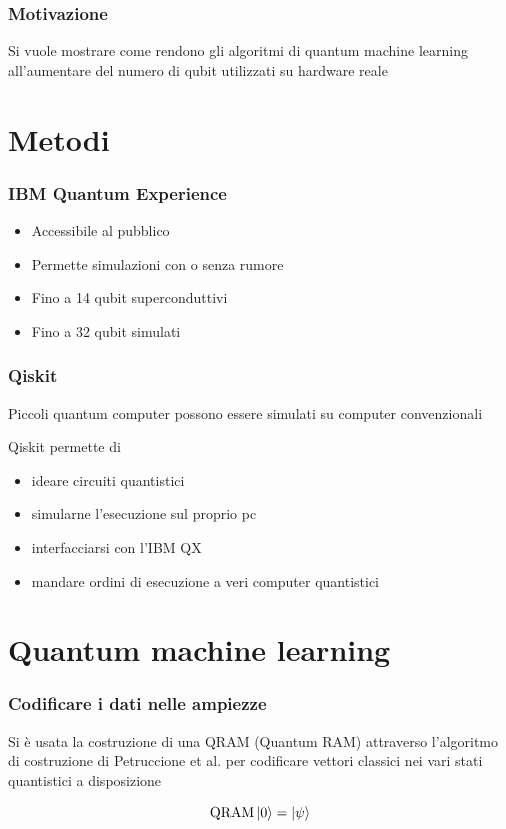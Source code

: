 \documentclass{beamer}
\begin{document}
	\begin{frame}
		\frametitle{Motivazione}
	
		Si vuole mostrare come rendono gli algoritmi di quantum machine 
		learning all'aumentare del numero di qubit utilizzati su hardware reale
	
	\end{frame}

	\section{Metodi}

	\begin{frame}
		\frametitle{IBM Quantum Experience}
	
		\begin{itemize}
			\item Accessibile al pubblico
			\item Permette simulazioni con o senza rumore
			\item Fino a 14 qubit superconduttivi
			\item Fino a 32 qubit simulati
		\end{itemize}
		
	
	\end{frame}

	\begin{frame}
		\frametitle{Qiskit}
	
		Piccoli quantum computer possono essere simulati su computer convenzionali

		Qiskit permette di 

		\begin{itemize}
			\item ideare circuiti quantistici
			\item simularne l'esecuzione sul proprio pc
			\item interfacciarsi con l'IBM QX
			\item mandare ordini di esecuzione a veri computer quantistici
		\end{itemize}
	
	\end{frame}

	\section{Quantum machine learning}

	\begin{frame}
		\frametitle{Codificare i dati nelle ampiezze}
	
		Si è usata la costruzione di una QRAM (Quantum RAM) attraverso 
		l'algoritmo di costruzione di Petruccione et al. per 
		codificare vettori classici nei vari stati quantistici 
		a disposizione

		\begin{equation*}
			\text{QRAM} \ket{0} = \ket{\psi}
		\end{equation*}
	
	\end{frame}
\end{document}

